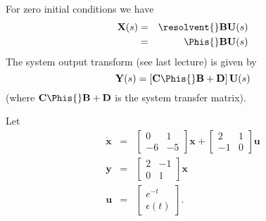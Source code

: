 \begin{slide} \label{slide:l4s11}
For zero initial conditions we have
\begin{eqnarray}\label{eq:l4eq6}
  \mathbf{X}(s)&=&\resolvent{}\mathbf{B}\mathbf{U}(s) \\
&=& \Phis{}\mathbf{B}\mathbf{U}(s) \label{eq:l4eq7}
\end{eqnarray}
The system output transform (see last lecture) is given by
\begin{equation}\label{eq:l4eq8}
 \mathbf{Y}(s)=\left[\mathbf{C}\Phis{}\mathbf{B}+\mathbf{D}\right]\mathbf{U}(s)
\end{equation} (where $\mathbf{C}\Phis{}\mathbf{B}+\mathbf{D}$ is the system transfer
matrix).
\end{slide}
\begin{slide}\label{slide:l4s12}
 Let
\begin{eqnarray*}\dot{\mathbf{x}}&=&\left[\begin{array}{cc}
  0 & 1 \\
  -6 & -5
\end{array}\right]\mathbf{x}+\left[\begin{array}{cc}
  2 & 1 \\
 -1 & 0
\end{array}\right]\mathbf{u}\\
\mathbf{y}&=&\left[\begin{array}{cc}
  2 & -1 \\
  0 & 1
\end{array}\right]\mathbf{x}\\ \mathbf{u}&=&\left[\begin{array}{c}
  e^{-t} \\
  \epsilon(t)
\end{array}\right].
\end{eqnarray*}
\end{slide}
